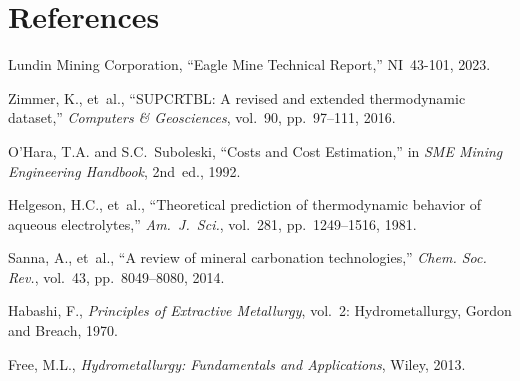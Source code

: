 \documentclass[11pt,a4paper]{article}
\begin{document}
\section*{References}

\begin{enumerate}[label={[\arabic*]}]
  \item Lundin Mining Corporation, ``Eagle Mine Technical Report,''
        NI~43-101, 2023.
  \item Zimmer, K., et~al., ``SUPCRTBL: A revised and extended
        thermodynamic dataset,'' \textit{Computers \& Geosciences},
        vol.~90, pp.~97--111, 2016.
  \item O'Hara, T.A. and S.C.~Suboleski, ``Costs and Cost Estimation,''
        in \textit{SME Mining Engineering Handbook}, 2nd~ed., 1992.
  \item Helgeson, H.C., et~al., ``Theoretical prediction of
        thermodynamic behavior of aqueous electrolytes,''
        \textit{Am.~J.~Sci.}, vol.~281, pp.~1249--1516, 1981.
  \item Sanna, A., et~al., ``A review of mineral carbonation
        technologies,'' \textit{Chem. Soc. Rev.}, vol.~43,
        pp.~8049--8080, 2014.
  \item Habashi, F., \textit{Principles of Extractive Metallurgy},
        vol.~2: Hydrometallurgy, Gordon and Breach, 1970.
  \item Free, M.L., \textit{Hydrometallurgy: Fundamentals and
        Applications}, Wiley, 2013.
\end{enumerate}
\end{document}
